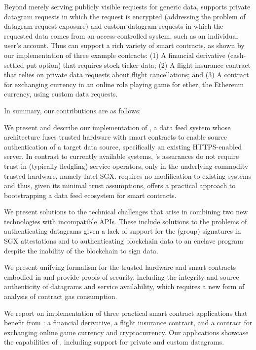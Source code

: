 Beyond merely serving publicly visible requests for generic data, \tc supports private datagram requests in which the request is encrypted (addressing the problem of datagram-request exposure) and custom datagram requests in which the requested data comes from an access-controlled system, such as an individual user's account. Thus \tc can support a rich variety of smart contracts, as shown by our implementation of three example contracts: (1) A financial derivative (cash-settled put option) that requires stock ticker data; (2) A flight insurance contract that relies on private data requests about flight cancellations; and (3) A contract for exchanging currency in an online role playing game for ether, the Ethereum currency, using custom data requests.

In summary, our contributions are as follows:

\vspace{2mm}
 We present and describe our implementation of \tc, a data feed system whose architecture fuses trusted hardware with smart contracts to enable source authentication of a target data source, specifically an existing HTTPS-enabled server. In contrast to currently available systems, \tc's assurances do not require trust in (typically fledgling) service operators, only in the underlying commodity trusted hardware, namely Intel SGX. \tc requires no modification to existing systems and thus, given its minimal trust assumptions, offers a practical approach to bootstrapping a data feed ecosystem for smart contracts.

\vspace{2mm}
 We present solutions to the technical challenges that arise in combining two new technologies with incompatible APIs. These include solutions to the problems of authenticating datagrams given a lack of support for the (group) signatures in SGX attestations and to authenticating blockchain data to an enclave program despite the inability of the blockchain to sign data. 

\vspace{2mm}
 We present unifying formalism for the trusted hardware and smart contracts embodied in \tc and provide proofs of security, including the integrity and source authenticity of datagrams and service availability, which requires a new form of analysis of contract gas consumption. 

\vspace{2mm}
 We report on implementation of three practical smart contract applications that benefit from \tc: a financial derivative, a flight insurance contract, and a contract for exchanging online game currency and cryptocurrency. Our applications showcase the capabilities of \tc, including support for private and custom datagrams. 


